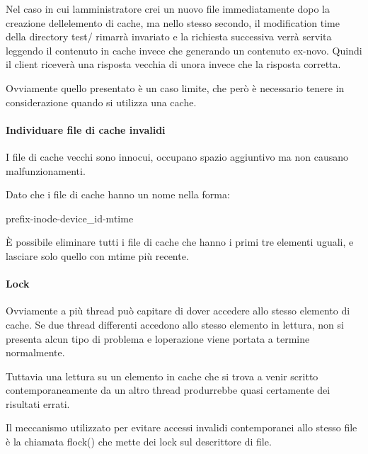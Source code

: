 \documentclass[a4paper,11pt]{article}
\begin{document}
\bigskip

{\sffamily
Nel caso in cui l{\textquotesingle}amministratore crei un nuovo file
immediatamente dopo la creazione dell{\textquotesingle}elemento di
cache, ma nello stesso secondo, il modification time della directory
test/ rimarr\`a invariato e la richiesta successiva verr\`a servita
leggendo il contenuto in cache invece che generando un contenuto
ex-novo. Quindi il client ricever\`a una risposta vecchia di
un{\textquotesingle}ora invece che la risposta corretta.}


\bigskip

{\sffamily
Ovviamente quello presentato \`e un caso limite, che per\`o \`e
necessario tenere in considerazione quando si utilizza una cache.}


\bigskip

\paragraph[Individuare file di cache invalidi]{Individuare file di cache
invalidi}
{\sffamily
I file di cache vecchi sono innocui, occupano spazio aggiuntivo ma non
causano malfunzionamenti.}

{\sffamily
Dato che i file di cache hanno un nome nella forma:}

{\sffamily
prefix-inode-device\_id-mtime}

{\sffamily
\`E possibile eliminare tutti i file di cache che hanno i primi tre
elementi uguali, e lasciare solo quello con mtime pi\`u recente.}


\bigskip

\paragraph{Lock}
{\sffamily
Ovviamente a pi\`u thread pu\`o capitare di dover accedere allo stesso
elemento di cache. Se due thread differenti accedono allo stesso
elemento in lettura, non si presenta alcun tipo di problema e
l{\textquotesingle}operazione viene portata a termine normalmente.}

{\sffamily
Tuttavia una lettura su un elemento in cache che si trova a venir
scritto contemporaneamente da un altro thread produrrebbe quasi
certamente dei risultati errati.}

{\sffamily
Il meccanismo utilizzato per evitare accessi invalidi contemporanei allo
stesso file \`e la chiamata flock() che mette dei lock sul descrittore
di file.}


\bigskip
\end{document}
